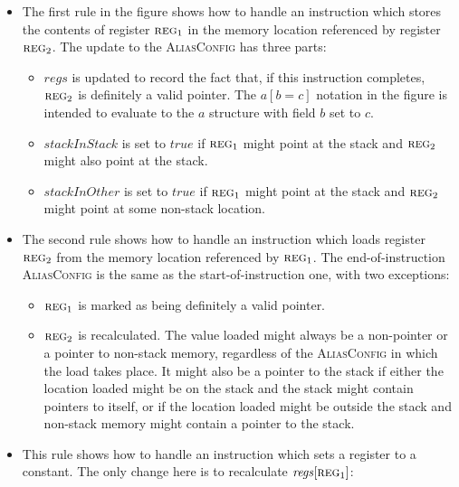 \begin{itemize}
\item[\circled{1}] The first rule in the figure shows how to handle an
  instruction which stores the contents of register $\textsc{reg}_1$
  in the memory location referenced by register $\textsc{reg}_2$.  The
  update to the \textsc{AliasConfig} has three parts:

  \begin{itemize}
  \item $\mathit{regs}$ is updated to record the fact that, if this
    instruction completes, $\textsc{reg}_2$ is definitely a valid
    pointer.  The $a[b = c]$ notation in the figure is intended to
    evaluate to the $a$ structure with field $b$ set to $c$.
  \item $\mathit{stackInStack}$ is set to $\mathit{true}$ if
    $\textsc{reg}_1$ might point at the stack and $\textsc{reg}_2$
    might also point at the stack.
  \item $\mathit{stackInOther}$ is set to $\mathit{true}$ if
    $\textsc{reg}_1$ might point at the stack and $\textsc{reg}_2$
    might point at some non-stack location.
  \end{itemize}
\item[\circled{2}] The second rule shows how to handle an instruction
  which loads register $\textsc{reg}_2$ from the memory location
  referenced by $\textsc{reg}_1$.  The end-of-instruction
  \textsc{AliasConfig} is the same as the start-of-instruction one,
  with two exceptions:

  \begin{itemize}
  \item $\textsc{reg}_1$ is marked as being definitely a valid pointer.
  \item $\textsc{reg}_2$ is recalculated.  The value loaded might
    always be a non-pointer or a pointer to non-stack memory,
    regardless of the \textsc{AliasConfig} in which the load takes
    place.  It might also be a pointer to the stack if either the
    location loaded might be on the stack and the stack might contain
    pointers to itself, or if the location loaded might be outside the
    stack and non-stack memory might contain a pointer to the stack.
  \end{itemize}
\item[\circled{3}] This rule shows how to handle an instruction which
  sets a register to a constant.  The only change here is to
  recalculate $\mathit{regs}[\textsc{reg}_1]$:


\end{itemize}
